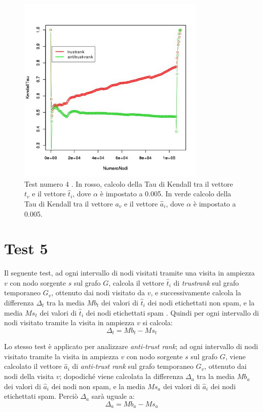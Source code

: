 \begin{figure}
 \centering
 \includegraphics[height=9cm]{immagini/test4/coplotTrustAnti_Mode1_set3776_62_alpha0005}
  \caption{Test numero 4 . In rosso, calcolo della Tau di Kendall tra il vettore $t_v$ e il vettore $\hat{t}_i$, dove $\alpha$ è impostato a 0.005. In verde calcolo della Tau di Kendall tra il vettore $a_v$ e il vettore $\hat{a}_i$, dove $\alpha$ è impostato a 0.005.}
 \label{fig:test4coplotTrustAntiModeB620005}
\end{figure}


\section{Test 5}
Il seguente test, ad ogni intervallo di nodi visitati tramite una visita in ampiezza \(v\)  con nodo sorgente \(s\) sul grafo \(G\), calcola il vettore \(\hat{t}_i\) di \textit{trustrank}  sul grafo temporaneo \(G_v\), ottenuto dai nodi visitato da \(v\), e successivamente calcola la differenza \(\Delta_t\) tra la media \(Mb_t\) dei valori di \(\hat{t}_i\) dei nodi etichettati non spam, e la media \(Ms_t\) dei valori di \(\hat{t}_i\) dei nodi etichettati spam . Quindi per ogni intervallo di nodi visitato tramite la visita in ampiezza \(v\) si calcola:
\begin{equation}
 \Delta_t = Mb_t-Ms_t
\end{equation}

Lo stesso test è applicato per analizzare \textit{anti-trust rank}; ad ogni intervallo di nodi visitato  tramite la visita in ampiezza \(v\) con nodo sorgente \(s\) sul grafo \(G\), viene calcolato il vettore \(\hat{a}_i\)  di \textit{anti-trust rank}  sul grafo temporaneo \(G_v\), ottenuto dai nodi della visita \(v\);  dopodiché viene calcolata la differenza \(\Delta_a\) tra la media \(Mb_a\) dei valori di \(\hat{a}_i\) dei nodi non spam, e la media \(Ms_a\) dei valori di \(\hat{a}_i\) dei nodi etichettati spam. Perciò \(\Delta_a\) sarà uguale a:
\begin{equation}
 \Delta_a=Mb_a-Ms_a
\end{equation}

